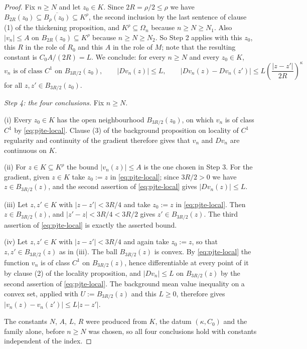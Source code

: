 \begin{proof}
Fix $n\ge N$ and let $z_0\in K$.  Since $2R=\rho/2\le\rho$ we have
$B_{2R}(z_0)\subseteq\overline{B_{\rho}(z_0)}\subseteq K^{\rho}$, the second inclusion by the
last sentence of clause (1) of the thickening proposition, and $K^{\rho}\subseteq\Omega_n$
because $n\ge N\ge N_1$.  Also $\lvert v_n\rvert\le A$ on $B_{2R}(z_0)\subseteq K^{\rho}$
because $n\ge N\ge N_2$.  So Step 2 applies with this $z_0$, this $R$ in the role of $R_0$ and
this $A$ in the role of $M$; note that the resulting constant is
$C_0A/(2R)=L$.  We conclude: for every $n\ge N$ and every $z_0\in K$,
\begin{equation}\label{eq:pjte-local}
  v_n\text{ is of class }C^{1}\text{ on }B_{3R/2}(z_0),\qquad
  \lvert Dv_n(z)\rvert\le L,\qquad
  \lvert Dv_n(z)-Dv_n(z')\rvert\le L\left(\frac{\lvert z-z'\rvert}{2R}\right)^{\kappa}
\end{equation}
for all $z,z'\in B_{3R/2}(z_0)$.

\medskip\noindent\emph{Step 4: the four conclusions.}
Fix $n\ge N$.

(i)  Every $z_0\in K$ has the open neighbourhood $B_{3R/2}(z_0)$, on which $v_n$ is of class
$C^{1}$ by \eqref{eq:pjte-local}.  Clause (3) of the background proposition on locality of
$C^{1}$ regularity and continuity of the gradient therefore gives that $v_n$ and $Dv_n$ are
continuous on $K$.

(ii)  For $z\in K\subseteq K^{\rho}$ the bound $\lvert v_n(z)\rvert\le A$ is the one chosen in
Step 3.  For the gradient, given $z\in K$ take $z_0:=z$ in \eqref{eq:pjte-local}; since
$3R/2>0$ we have $z\in B_{3R/2}(z)$, and the second assertion of \eqref{eq:pjte-local} gives
$\lvert Dv_n(z)\rvert\le L$.

(iii)  Let $z,z'\in K$ with $\lvert z-z'\rvert<3R/4$ and take $z_0:=z$ in
\eqref{eq:pjte-local}.  Then $z\in B_{3R/2}(z)$, and $\lvert z'-z\rvert<3R/4<3R/2$ gives
$z'\in B_{3R/2}(z)$.  The third assertion of \eqref{eq:pjte-local} is exactly the asserted
bound.

(iv)  Let $z,z'\in K$ with $\lvert z-z'\rvert<3R/4$ and again take $z_0:=z$, so that
$z,z'\in B_{3R/2}(z)$ as in (iii).  The ball $B_{3R/2}(z)$ is convex.  By
\eqref{eq:pjte-local} the function $v_n$ is of class $C^{1}$ on $B_{3R/2}(z)$, hence
differentiable at every point of it by clause (2) of the locality proposition, and
$\lvert Dv_n\rvert\le L$ on $B_{3R/2}(z)$ by the second assertion of \eqref{eq:pjte-local}.
The background mean value inequality on a convex set, applied with $U:=B_{3R/2}(z)$ and this
$L\ge0$, therefore gives $\lvert v_n(z)-v_n(z')\rvert\le L\lvert z-z'\rvert$.

\medskip\noindent The constants $N$, $A$, $L$, $R$ were produced from $K$, the datum
$(\kappa,C_0)$ and the family alone, before $n\ge N$ was chosen, so all four conclusions hold
with constants independent of the index.
\end{proof}
